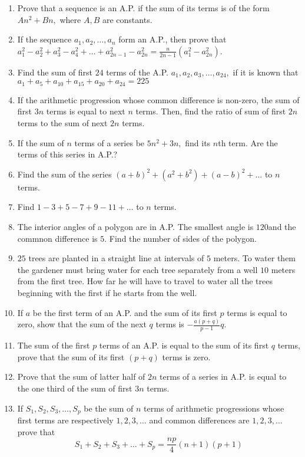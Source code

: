\begin{enumerate}
\item Prove that a sequence is an A.P. if the sum of its terms is of the form $An^2 + Bn,$ where $A, B$ are constants.
\item If the sequence $a_1, a_2, \ldots, a_n$ form an A.P., then prove that $a_1^2 - a_2^2 + a_3^2 - a_4^2 + \ldots + a_{2n - 1}^2
  - a_{2n}^2 = \frac{n}{2n - 1}(a_1^2 - a_{2n}^2)$.
\item Find the sum of first $24$ terms of the A.P. $a_1, a_2, a_3, \ldots, a_{24},$ if it is known that $a_1 + a_5 + a_{10} +
  a_{15} + a_{20} + a_{24} = 225$
\item If the arithmetic progression whose common difference is non-zero, the sum of first $3n$ terms is equal to next $n$
  terms. Then, find the ratio of sum of first $2n$ terms to the sum of next $2n$ terms.
\item If the sum of $n$ terms of a series be $5n^2 + 3n,$ find its $n$th term. Are the terms of this series in A.P.?
\item Find the sum of the series $(a + b)^2 + (a^2 + b^2) + (a - b)^2 + \ldots$ to $n$ terms.
\item Find $1 - 3 + 5 - 7 + 9 - 11 + \ldots$ to $n$ terms.
\item The interior angles of a polygon are in A.P. The smallest angle is $120$\textdegree and the commnon difference is
  $5$\textdegree. Find the number of sides of the polygon.
\item $25$ trees are planted in a straight line at intervals of $5$ meters. To water them the gardener must bring water for each
  tree separately from a well $10$ meters from the first tree. How far he will have to travel to water all the trees beginning with
  the first if he starts from the well.
\item If $a$ be the first term of an A.P. and the sum of its first $p$ terms is equal to zero, show that the sum of the next $q$
  terms is $-\frac{a(p + q)}{p - 1}q$.
\item The sum of the first $p$ terms of an A.P. is equal to the sum of its first $q$ terms, prove that the sum of its first $(p +
  q)$ terms is zero.
\item Prove that the sum of latter half of $2n$ terms of a series in A.P. is equal to the one third of the sum of first $3n$ terms.
\item If $S_1, S_2, S_3, \ldots, S_p$ be the sum of $n$ terms of arithmetic progressions whose first terms are respectively $1, 2,
  3, \ldots$ and common differences are $1, 2, 3, \ldots$ prove that $$S_1 + S_2 + S_3 + \ldots + S_p = \frac{np}{4}(n+1)(p+1)$$

\end{enumerate}
